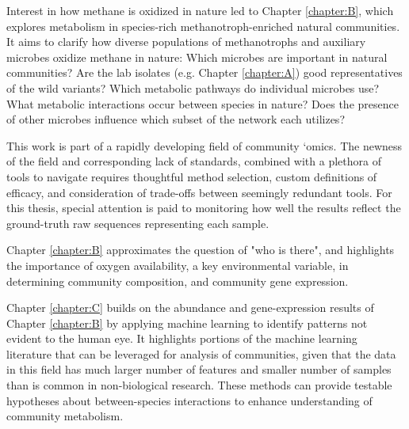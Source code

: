 Interest in how methane is oxidized in nature led to Chapter \ref{chapter:B}, which explores metabolism in species-rich methanotroph-enriched natural communities.
It aims to clarify how diverse populations of methanotrophs and auxiliary microbes oxidize methane in nature: %
Which microbes are important in natural communities?
Are the lab isolates (e.g. Chapter \ref{chapter:A}) good representatives of the wild variants?
Which metabolic pathways do individual microbes use?
What metabolic interactions occur between species in nature?
Does the presence of other microbes influence which subset of the network each utilizes?

This work is part of a rapidly developing field of community `omics.
The newness of the field and corresponding lack of standards, combined with a plethora of tools to navigate requires thoughtful method selection, custom definitions of efficacy, and consideration of trade-offs between seemingly redundant tools.
For this thesis, special attention is paid to monitoring how well the results reflect the ground-truth raw sequences representing each sample.


Chapter \ref{chapter:B} approximates %
the question of "who is there", and highlights the importance of oxygen availability, a key environmental variable, in determining community composition, and community gene expression.

Chapter \ref{chapter:C} builds on the abundance and gene-expression results of Chapter \ref{chapter:B} by applying machine learning to identify patterns not evident to the human eye.
It highlights portions of the machine learning literature that can be leveraged for analysis of communities, given that the data in this field has much larger number of features and smaller number of samples than is common in non-biological research.
These methods can provide testable hypotheses about between-species interactions to enhance understanding of community metabolism.





